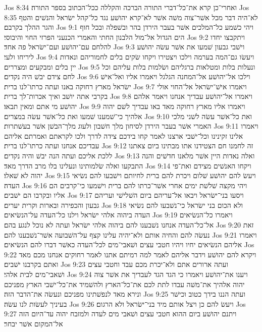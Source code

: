 Jos 8:34  ואחרי־כן קרא את־כל־דברי התורה הברכה והקללה ככל־הכתוב בספר התורה׃
Jos 8:35  לא־היה דבר מכל אשׁר־צוה משׁה אשׁר לא־קרא יהושׁע נגד כל־קהל ישׂראל והנשׁים והטף והגר ההלך בקרבם׃
Jos 9:1  ויהי כשׁמע כל־המלכים אשׁר בעבר הירדן בהר ובשׁפלה ובכל חוף הים הגדול אל־מול הלבנון החתי והאמרי הכנעני הפרזי החוי והיבוסי׃
Jos 9:2  ויתקבצו יחדו להלחם עם־יהושׁע ועם־ישׂראל פה אחד׃
Jos 9:3  וישׁבי גבעון שׁמעו את אשׁר עשׂה יהושׁע ליריחו ולעי׃
Jos 9:4  ויעשׂו גם־המה בערמה וילכו ויצטירו ויקחו שׂקים בלים לחמוריהם ונאדות יין בלים ומבקעים ומצררים׃
Jos 9:5  ונעלות בלות ומטלאות ברגליהם ושׂלמות בלות עליהם וכל לחם צידם יבשׁ היה נקדים׃
Jos 9:6  וילכו אל־יהושׁע אל־המחנה הגלגל ויאמרו אליו ואל־אישׁ ישׂראל מארץ רחוקה באנו ועתה כרתו־לנו ברית׃
Jos 9:7  ויאמרו אישׁ־ישׂראל אל־החוי אולי בקרבי אתה יושׁב ואיך אכרות־לך ברית׃
Jos 9:8  ויאמרו אל־יהושׁע עבדיך אנחנו ויאמר אלהם יהושׁע מי אתם ומאין תבאו׃
Jos 9:9  ויאמרו אליו מארץ רחוקה מאד באו עבדיך לשׁם יהוה אלהיך כי־שׁמענו שׁמעו ואת כל־אשׁר עשׂה במצרים׃
Jos 9:10  ואת כל־אשׁר עשׂה לשׁני מלכי האמרי אשׁר בעבר הירדן לסיחון מלך חשׁבון ולעוג מלך־הבשׁן אשׁר בעשׁתרות׃
Jos 9:11  ויאמרו אלינו זקינינו וכל־ישׁבי ארצנו לאמר קחו בידכם צידה לדרך ולכו לקראתם ואמרתם אליהם עבדיכם אנחנו ועתה כרתו־לנו ברית׃
Jos 9:12  זה לחמנו חם הצטידנו אתו מבתינו ביום צאתנו ללכת אליכם ועתה הנה יבשׁ והיה נקדים׃
Jos 9:13  ואלה נאדות היין אשׁר מלאנו חדשׁים והנה התבקעו ואלה שׂלמותינו ונעלינו בלו מרב הדרך מאד׃
Jos 9:14  ויקחו האנשׁים מצידם ואת־פי יהוה לא שׁאלו׃
Jos 9:15  ויעשׂ להם יהושׁע שׁלום ויכרת להם ברית לחיותם וישׁבעו להם נשׂיאי העדה׃
Jos 9:16  ויהי מקצה שׁלשׁת ימים אחרי אשׁר־כרתו להם ברית וישׁמעו כי־קרבים הם אליו ובקרבו הם ישׁבים׃
Jos 9:17  ויסעו בני־ישׂראל ויבאו אל־עריהם ביום השׁלישׁי ועריהם גבעון והכפירה ובארות וקרית יערים׃
Jos 9:18  ולא הכום בני ישׂראל כי־נשׁבעו להם נשׂיאי העדה ביהוה אלהי ישׂראל וילנו כל־העדה על־הנשׂיאים׃
Jos 9:19  ויאמרו כל־הנשׂיאים אל־כל־העדה אנחנו נשׁבענו להם ביהוה אלהי ישׂראל ועתה לא נוכל לנגע בהם׃
Jos 9:20  זאת נעשׂה להם והחיה אותם ולא־יהיה עלינו קצף על־השׁבועה אשׁר־נשׁבענו להם׃
Jos 9:21  ויאמרו אליהם הנשׂיאים יחיו ויהיו חטבי עצים ושׁאבי־מים לכל־העדה כאשׁר דברו להם הנשׂיאים׃
Jos 9:22  ויקרא להם יהושׁע וידבר אליהם לאמר למה רמיתם אתנו לאמר רחוקים אנחנו מכם מאד ואתם בקרבנו ישׁבים׃
Jos 9:23  ועתה ארורים אתם ולא־יכרת מכם עבד וחטבי עצים ושׁאבי־מים לבית אלהי׃
Jos 9:24  ויענו את־יהושׁע ויאמרו כי הגד הגד לעבדיך את אשׁר צוה יהוה אלהיך את־משׁה עבדו לתת לכם את־כל־הארץ ולהשׁמיד את־כל־ישׁבי הארץ מפניכם ונירא מאד לנפשׁתינו מפניכם ונעשׂה את־הדבר הזה׃
Jos 9:25  ועתה הננו בידך כטוב וכישׁר בעיניך לעשׂות לנו עשׂה׃
Jos 9:26  ויעשׂ להם כן ויצל אותם מיד בני־ישׂראל ולא הרגום׃
Jos 9:27  ויתנם יהושׁע ביום ההוא חטבי עצים ושׁאבי מים לעדה ולמזבח יהוה עד־היום הזה אל־המקום אשׁר יבחר׃
